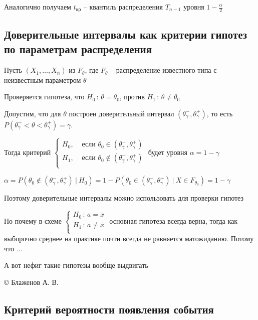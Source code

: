 Аналогично получаем $t_\text{кр}$ -- квантиль распределения $T_{n - 1}$ уровня $1 - \frac{\alpha}{2}$

\subsection{Доверительные интервалы как критерии гипотез по параметрам распределения}

Пусть $(X_1, \dots, X_n)$ из $F_\theta$, где $F_\theta$ -- распределение известного типа с неизвестным параметром $\theta$

Проверяется гипотеза, что $H_0 \, : \, \theta = \theta_0$, против $H_1 \, : \, \theta \neq \theta_0$

Допустим, что для $\theta$ построен доверительный интервал $(\theta_\gamma^-, \theta_\gamma^+)$, то есть 
$P(\theta_\gamma^- < \theta < \theta_\gamma^+) = \gamma$.

Тогда критерий 
$\begin{cases}
    H_0, & \text{ если } \theta_0 \in (\theta_\gamma^-, \theta_\gamma^+) \\ 
    H_1, & \text{ если } \theta_0 \not\in (\theta_\gamma^-, \theta_\gamma^+) \\ 
\end{cases}$ будет уровня $\alpha = 1 - \gamma$

$\alpha = P(\theta_0 \not\in (\theta_\gamma^-, \theta_\gamma^+) \ | \ H_0) = 1 - P(\theta_0 \in (\theta_\gamma^-, \theta_\gamma^+) \ | \ X \in F_{\theta_0}) = 1 - \gamma$

Поэтому доверительные интервалы можно использовать для проверки гипотез

\mediumvspace 

Но почему в схеме $\begin{cases}
    H_0 \, : \, a = \overline{x} \\
    H_1 \, : \, a \neq \overline{x} \\
\end{cases}$ основная гипотеза всегда верна, тогда как выборочно среднее на практике почти всегда не равняется матожиданию. Потому что ...

\begin{tcolorbox}
    А вот нефиг такие гипотезы вообще выдвигать

    \hfill © Блаженов А. В.
\end{tcolorbox}

\subsection{Критерий вероятности появления события}

